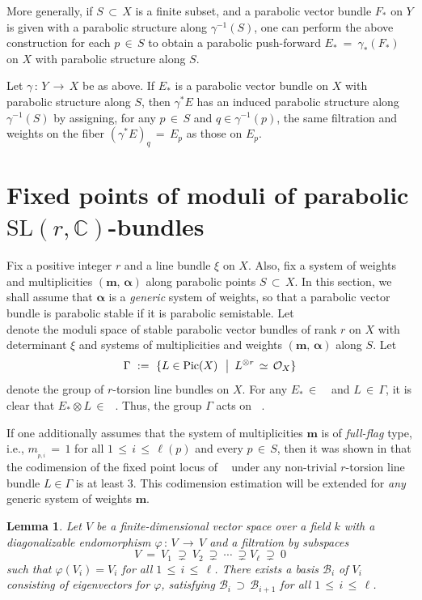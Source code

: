\documentclass[10pt,reqno]{amsart}
\DeclareMathOperator{\Pic}{\textnormal{Pic}}
\DeclareMathOperator{\Malpha}{\mc{M}^{\boldsymbol{m,\alpha}}_X(r,\ \xi)}
\newcommand{\mc}[1]{\mathcal{#1}}
\newcommand{\bb}[1]{\mathbb{#1}}
\newtheorem{lemma}[theorem]{Lemma}
\theoremstyle{myroman}
\numberwithin{equation}{section}
\begin{document}
	More generally, if $S\,\subset\, X$ is a finite subset, and a parabolic vector bundle $F_*$ on $Y$ is given
	with a parabolic structure along $\gamma^{-1}(S)$, one can perform the above
	construction for each $p\,\in\, S$ to obtain a 
	parabolic push-forward $E_*\ =\ \gamma_* (F_*)$ on $X$ with parabolic structure along $S$.
	
	Let $\gamma\,:\,Y\,\longrightarrow\, X$ be as above. If $E_*$ is a parabolic vector bundle on $X$ with parabolic 
	structure along $S$, then $\gamma^*E$ has an induced parabolic structure along $\gamma^{-1}(S)$ by assigning, 
	for any $p\,\in\, S$ and $q\in \gamma^{-1}(p)$, the same filtration and weights on the fiber 
	$(\gamma^*E)_q\,=\, E_p$ as those on $E_p$.
	
	\section{Fixed points of moduli of parabolic $\text{SL}(r,\bb{C})$-bundles}\label{section:fixed-point-locus}
	
	Fix a positive integer $r$ and a line bundle $\xi$ on $X$. Also, fix a system of weights and multiplicities 
	$(\boldsymbol{m,\,\alpha})$ along parabolic points $S\,\subset\, X$. In this section, we shall assume that 
	$\boldsymbol{\alpha}$ is a \textit{generic} system of weights, so that a parabolic vector bundle is parabolic 
	stable if it is parabolic semistable. Let $$\Malpha$$ denote the moduli space of stable parabolic vector bundles 
	of rank $r$ on $X$ with determinant $\xi$ and systems of multiplicities and weights $(\boldsymbol{m,\,\alpha})$ 
	along $S$. Let
	$$
	\Gamma\ :=\ \{L\in \Pic(X)\ \ \big\vert\, \ L^{\otimes r}\,\simeq\, \mc{O}_X\}
	$$ denote the group of $r$-torsion line bundles on $X$. For any $E_*\, \in\,
	\Malpha$ and $L\, \in\, \Gamma$, it is clear that $E_*\otimes L\, \in\, \Malpha$.
	Thus, the group $\Gamma$ acts on $\Malpha$.
	
	If one additionally assumes that the system of multiplicities $\boldsymbol{m}$ is of \textit{full-flag} type, 
	i.e., $m_{_{p,i}}\,=\,1$ for all $1\,\leq\, i\,\leq\, \ell(p)$ and every $p\,\in \,S$, then it was shown in
	\cite{BCD23} that the 
	codimension of the fixed point locus of $\Malpha$ under any non-trivial $r$-torsion line bundle $L\in \Gamma$ is 
	at least $3$. This codimension estimation will be extended for \textit{any} generic system of 
	weights $\boldsymbol{m}$.
	
	\begin{lemma}\label{lem:eigenbasis}
		Let $V$ be a finite-dimensional vector space over a field $k$ with a diagonalizable endomorphism
		$\varphi\,:\, V\,\longrightarrow \,V$ and a filtration by subspaces
		$$V\ =\ V_1\ \supsetneq\ V_2\ \supsetneq \ \cdots\ \supsetneq V_\ell \ \supsetneq\ 0$$
		such that $\varphi(V_i) = V_i$ for all $1\, \leq\, i\, \leq\, \ell$. There exists a basis $\mc{B}_i$ of $V_i$
		consisting of eigenvectors for $\varphi$, satisfying $\mc{B}_i\,\supset\, \mc{B}_{i+1}$ for all
		$1\,\leq\, i\,\leq \,\ell$.
	\end{lemma}
	
\end{document}
